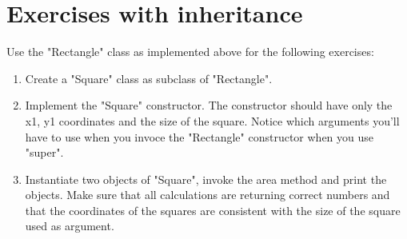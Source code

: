 \section{Exercises with inheritance}

Use the "Rectangle" class as implemented above for the following exercises:

\begin{enumerate}

\item Create a "Square" class as subclass of "Rectangle".

\item Implement the "Square" constructor. The constructor should have only the x1, y1 coordinates and the size of the square. Notice which arguments you'll have to use when you invoce the "Rectangle" constructor when you use "super".

\item Instantiate two objects of "Square", invoke the area method and print the objects. Make sure that all calculations are returning correct numbers and that the coordinates of the squares are consistent with the size of the square used as argument.

\end{enumerate}